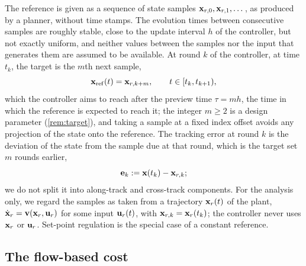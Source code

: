 The reference is given as a sequence of state samples $\mathbf{x}_{r,0},\mathbf{x}_{r,1},\dots$, as produced by a
planner, without time stamps.
The evolution times between consecutive samples are roughly stable, close to the update interval
$h$ of the controller, but not exactly uniform, and neither values between the samples nor the
input that generates them are assumed to be available.
At round $k$ of the controller, at time $t_k$, the target is the $m$th next sample,
\begin{equation}\label{eq:xref}
    \mathbf{x}_{\mathrm{ref}}(t) = \mathbf{x}_{r,k+m}, \qquad t\in[t_k,t_{k+1}),
\end{equation}
which the controller aims to reach after the preview time $\tau = mh$, the time in which the
reference is expected to reach it; the integer $m \ge 2$ is a design parameter
(\cref{rem:target}), and taking a sample at a fixed index offset avoids any projection of the state
onto the reference.
The tracking error at round $k$ is the deviation of the state from the sample due at that round,
which is the target set $m$ rounds earlier,
\begin{equation}\label{eq:error}
    \mathbf{e}_k := \mathbf{x}(t_k) - \mathbf{x}_{r,k};
\end{equation}
we do not split it into along-track and cross-track components.
For the analysis only, we regard the samples as taken from a trajectory $\mathbf{x}_r(t)$ of the plant,
$\dot{\mathbf{x}}_r = \mathbf{v}(\mathbf{x}_r,\mathbf{u}_r)$ for some input $\mathbf{u}_r(t)$, with $\mathbf{x}_{r,k} = \mathbf{x}_r(t_k)$; the controller
never uses $\mathbf{x}_r$ or $\mathbf{u}_r$.
Set-point regulation is the special case of a constant reference.

\subsection{The flow-based cost}\label{sec:cost}

